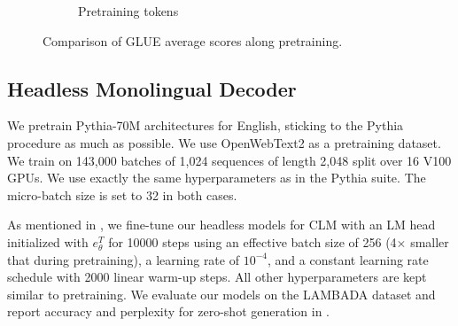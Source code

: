 \begin{figure}
\begin{subfigure}[b]{0.40\columnwidth}
         \caption{Pretraining tokens}
         \label{fig:bert_compare_tokens}
    \end{subfigure}
    \caption{Comparison of GLUE average scores along pretraining.}
    \label{fig:train_curve_mlm}
\end{figure}



\subsection{Headless Monolingual Decoder}
\label{sec:mono_decoder}
We pretrain Pythia-70M architectures for English, sticking to the Pythia procedure \citep{biderman2023pythia} as much as possible. We use OpenWebText2 as a pretraining dataset. We train on 143,000 batches of 1,024 sequences of length 2,048 split over 16 V100 GPUs. We use exactly the same hyperparameters as in the Pythia suite. The micro-batch size is set to 32 in both cases.

%
As mentioned in , we fine-tune our headless models for CLM with an LM head initialized with $e_{\theta}^T$ for 10000 steps using an effective batch size of 256 (4$\times$ smaller that during pretraining), a learning rate of $10^{-4}$, and a constant learning rate schedule with 2000 linear warm-up steps. All other hyperparameters are kept similar to pretraining. We evaluate our models on the LAMBADA dataset and report accuracy and perplexity for zero-shot generation in .

